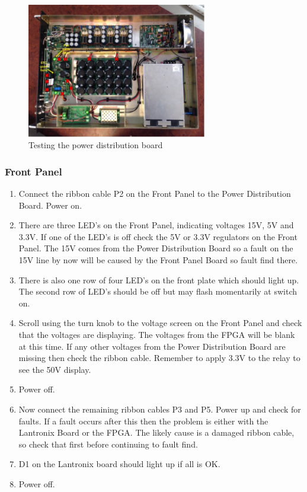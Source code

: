 \begin{figure}[H]
	\centering
	\includegraphics[width=0.7\textwidth]{images/hardware/box_distro.jpg}
	\caption{Testing the power distribution board}
	\label{fig:hw_box_distro}
\end{figure}

\subsubsection{Front Panel}

\begin{enumerate}
	\item Connect the ribbon cable P2 on the Front Panel to the Power Distribution Board. Power on.
	\item There are three LED’s on the Front Panel, indicating voltages 15V, 5V and 3.3V. If one of the LED’s is off check the 5V or 3.3V regulators on the Front Panel. The 15V comes from the Power Distribution Board so a fault on the 15V line by now will be caused by the Front Panel Board so fault find there.
	\item There is also one row of four LED’s on the front plate which should light up. The second row of LED’s should be off but may flash momentarily at switch on.
	\item Scroll using the turn knob to the voltage screen on the Front Panel and check that the voltages are displaying. The voltages from the FPGA will be blank at this time. If any other voltages from the Power Distribution Board are missing then check the ribbon cable. Remember to apply 3.3V to the relay to see the 50V display.
	\item Power off.
	\item Now connect the remaining ribbon cables P3 and P5. Power up and check for faults. If a fault occurs after this then the problem is either with the Lantronix Board or the FPGA. The likely cause is a damaged ribbon cable, so check that first before continuing to fault find.
	\item D1 on the Lantronix board should light up if all is OK.
	\item Power off.
\end{enumerate}

